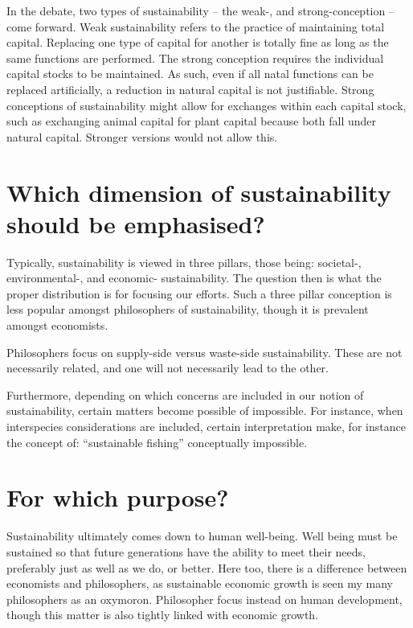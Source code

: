 \documentclass[12pt]{report}
\begin{document}
In the debate, two types of sustainability -- the weak-, and strong-conception
-- come forward. Weak sustainability refers to the practice of maintaining total
capital. Replacing one type of capital for another is totally fine as long as
the same functions are performed. The strong conception requires the individual
capital stocks to be maintained. As such, even if all natal functions can be
replaced artificially, a reduction in natural capital is not justifiable. Strong
conceptions of sustainability might allow for exchanges within each capital
stock, such as exchanging animal capital for plant capital because both fall
under natural capital. Stronger versions would not allow this.

\section{Which dimension of sustainability should be emphasised?}

Typically, sustainability is viewed in three pillars, those being: societal-,
environmental-, and economic- sustainability. The question then is what the
proper distribution is for focusing our efforts. Such a three pillar conception
is less popular amongst philosophers of sustainability, though it is prevalent
amongst economists.

Philosophers focus on supply-side versus waste-side sustainability. These are
not necessarily related, and one will not necessarily lead to the other.

Furthermore, depending on which concerns are included in our notion of
sustainability, certain matters become possible of impossible. For instance,
when interspecies considerations are included, certain interpretation make, for
instance the concept of: ``sustainable fishing'' conceptually impossible.

\section{For which purpose?}

Sustainability ultimately comes down to human well-being. Well being must be
sustained so that future generations have the ability to meet their needs,
preferably just as well as we do, or better. Here too, there is a difference
between economists and philosophers, as sustainable economic growth is seen my
many philosophers as an oxymoron. Philosopher focus instead on human
development, though this matter is also tightly linked with economic growth.
\end{document}
